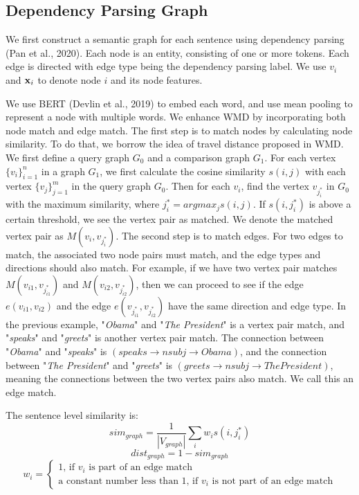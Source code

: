 \documentclass[letterpaper]{article}
\begin{document}
\subsection{Dependency Parsing Graph}
We first construct a semantic graph for each sentence using dependency parsing (Pan et al., 2020). Each node is an entity, consisting of one or more tokens. Each edge is directed with edge type being the dependency parsing label. We use $v_i$ and $\mathbf{x}_i$ to denote node $i$ and its node features.

We use BERT (Devlin et al., 2019) to embed each word, and use mean pooling to represent a node with multiple words. We enhance WMD by incorporating both node match and edge match. The first step is to match nodes by calculating node similarity. To do that, we borrow the idea of travel distance proposed in WMD. We first define a query graph $G_0$  and a comparison graph $G_1$. For each vertex $\{v_i\}_{i=1}^{n}$  in a graph $G_1$,  we first calculate the cosine similarity $s(i, j)$ with each vertex $\{v_j\}_{j=1}^{m}$ in the query graph $G_0$. Then for each $v_i$, find the vertex $v_{j_i^*}$ in $G_0$ with the maximum similarity, where $j_i^* = argmax_j s(i,j)$. If $s(i, j_i^*)$ is above a certain threshold, we see the vertex pair as matched. We denote the matched vertex pair as $M(v_i, v_{j_i^*})$. The second step is to match edges. For two edges to match, the associated two node pairs must match, and the edge types and directions should also match. For example, if we have two vertex pair matches $M(v_{i1}, v_{j_{i1}^*})$ and $M(v_{i2}, v_{j_{i2}^*})$, then we can proceed to see if the edge $e(v_{i1}, v_{i2})$ and the edge $e(v_{j_{i1}^*}, v_{j_{i2}^*})$ have the same direction and edge type. In the previous example, "\textit{Obama}" and "\textit{The President}" is a vertex pair match, and "\textit{speaks}" and "\textit{greets}" is another vertex pair match. The connection between "\textit{Obama}" and "\textit{speaks}" is $(speaks \rightarrow \textit{nsubj} \rightarrow Obama)$, and the connection between "\textit{The President}" and "\textit{greets}" is  $(greets \rightarrow \textit{nsubj} \rightarrow The President)$, meaning the connections between the two vertex pairs also match. We call this an edge match. 

The sentence level similarity is:
\begin{equation}
	sim_{graph} = \frac{1}{|V_{graph}|}\sum_i w_i  s(i, j_i^*) 
\end{equation}	
\begin{equation}
	dist_{graph} = 1-sim_{graph}
\end{equation}
\begin{equation}
	w_i = \begin{cases}
                  	1 \textrm{, if } v_i \textrm{ is part of an edge match} \\
	                 \textrm{a constant number less than 1, if }v_i \textrm{ is not part of an edge match}
                 \end{cases}
\end{equation}
\end{document}
